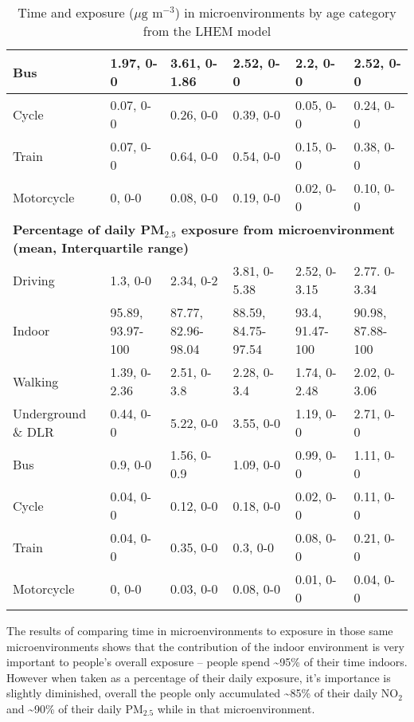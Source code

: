 \begin{landscape}
\begin{table}[H]
\begin{tabular}{ | p{3.5cm} | p{3.3cm} | p{3.9cm} | p{3.3cm} | p{3.1cm} | p{3.1cm} |}
     Bus & 1.97, 0-0 & 3.61, 0-1.86 & 2.52, 0-0 & 2.2, 0-0 & 2.52, 0-0 \\ \hline
     Cycle & 0.07, 0-0  & 0.26, 0-0 & 0.39, 0-0 & 0.05, 0-0 & 0.24, 0-0 \\ \hline
     Train & 0.07, 0-0 & 0.64, 0-0 & 0.54, 0-0 & 0.15, 0-0 & 0.38, 0-0  \\ \hline
     Motorcycle & 0, 0-0 & 0.08, 0-0 & 0.19, 0-0 & 0.02, 0-0 & 0.10, 0-0 \\ \hline
     \multicolumn{6}{|l|}{\bfseries{Percentage of daily PM$_{2.5}$ exposure from microenvironment (mean, Interquartile range)}} \\ \hline
     Driving & 1.3, 0-0 & 2.34, 0-2 & 3.81, 0-5.38 & 2.52, 0-3.15 & 2.77. 0-3.34 \\ \hline
     Indoor & 95.89, 93.97-100 & 87.77, 82.96-98.04 & 88.59, 84.75-97.54 & 93.4, 91.47-100 & 90.98, 87.88-100 \\ \hline
     Walking & 1.39, 0-2.36 & 2.51, 0-3.8 & 2.28, 0-3.4 & 1.74, 0-2.48 & 2.02, 0-3.06 \\ \hline
     Underground \& DLR & 0.44, 0-0 & 5.22, 0-0 & 3.55, 0-0 & 1.19, 0-0 & 2.71, 0-0 \\ \hline
     Bus & 0.9, 0-0 & 1.56, 0-0.9 & 1.09, 0-0 & 0.99, 0-0 & 1.11, 0-0 \\ \hline
     Cycle & 0.04, 0-0 & 0.12, 0-0 & 0.18, 0-0 & 0.02, 0-0 & 0.11, 0-0 \\ \hline
     Train & 0.04, 0-0 & 0.35, 0-0 & 0.3, 0-0 & 0.08, 0-0 & 0.21, 0-0 \\ \hline
     Motorcycle & 0, 0-0 & 0.03, 0-0 & 0.08, 0-0 & 0.01, 0-0 & 0.04, 0-0 \\ \hline
    \end{tabular}
\caption{Time and exposure ($\mu \text{g m}^{-3}$) in microenvironments by age category from the LHEM model}
\label{tab:results_microenvironments_exposure}
\end{table}

\end{landscape}

\restoregeometry

The results of comparing time in microenvironments to exposure in those same microenvironments shows that the contribution of the indoor environment is very important to people's overall exposure -- people spend \textasciitilde95\% of their time indoors. However when taken as a percentage of their daily exposure, it's importance is slightly diminished, overall the people only accumulated \textasciitilde85\% of their daily NO$_{2}$ and \textasciitilde90\% of their daily PM$_{2.5}$ while in that microenvironment.

